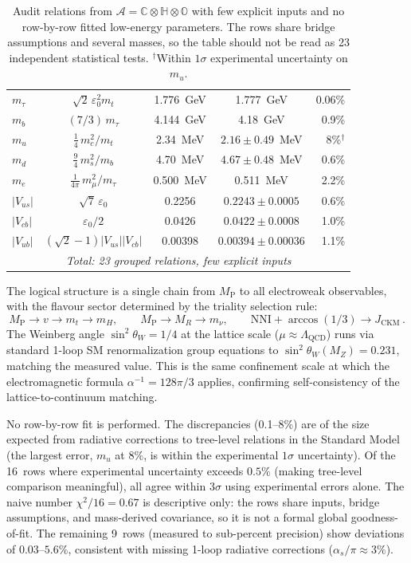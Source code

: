 \documentclass[12pt,a4paper]{article}
\theoremstyle{definition}
\theoremstyle{remark}
\newcommand{\Oct}{\mathbb{O}}
\newcommand{\Quat}{\mathbb{H}}
\newcommand{\Comp}{\mathbb{C}}
\newcommand{\Alg}{\mathcal{A}}
\newcommand{\MP}{M_{\mathrm{P}}}
\newcommand{\MR}{M_R}
\begin{document}
\begin{table}[h]
\begin{tabular}{@{}lcccr@{}}
$m_\tau$ & $\sqrt{2}\,\varepsilon_0^2 m_t$ & 1.776~GeV & 1.777~GeV & 0.06\% \\
$m_b$ & $(7/3)\,m_\tau$ & 4.144~GeV & 4.18~GeV & 0.9\% \\
$m_u$ & $\frac{1}{4}\,m_c^2/m_t$ & 2.34~MeV & $2.16\pm0.49$~MeV & 8\%$^\dagger$ \\
$m_d$ & $\frac{9}{4}\,m_s^2/m_b$ & 4.70~MeV & $4.67\pm0.48$~MeV & 0.6\% \\
$m_e$ & $\frac{1}{4\pi}\,m_\mu^2/m_\tau$ & 0.500~MeV & 0.511~MeV & 2.2\% \\
$|V_{us}|$ & $\sqrt{7}\,\varepsilon_0$ & 0.2256 & $0.2243\pm0.0005$ & 0.6\% \\
$|V_{cb}|$ & $\varepsilon_0/2$ & 0.0426 & $0.0422\pm0.0008$ & 1.0\% \\
$|V_{ub}|$ & $(\sqrt{2}{-}1)|V_{us}||V_{cb}|$ & 0.00398 & $0.00394\pm0.00036$ & 1.1\% \\
\midrule
\multicolumn{5}{c}{\textit{Total: 23 grouped relations, few explicit inputs}} \\
\bottomrule
\end{tabular}
\caption{Audit relations from $\Alg = \Comp\otimes\Quat\otimes\Oct$ with few 
explicit inputs and no row-by-row fitted low-energy parameters. The rows share 
bridge assumptions and several masses, so the table should not be read as 23 
independent statistical tests. $^\dagger$Within $1\sigma$ experimental 
uncertainty on $m_u$.}
\label{tab:predictions}
\end{table}

The logical structure is a single chain from $\MP$ to all electroweak 
observables, with the flavour sector determined by the triality selection rule:
\begin{equation}
\MP \to v \to m_t \to m_H, \qquad \MP \to \MR \to m_\nu, \qquad
\text{NNI} + \arccos(1/3) \to J_{\text{CKM}}\,.
\end{equation}
The Weinberg angle $\sin^2\theta_W = 1/4$ at the lattice scale 
($\mu \approx \Lambda_{\text{QCD}}$) runs via standard 1-loop SM 
renormalization group equations to $\sin^2\theta_W(M_Z) = 0.231$, matching 
the measured value. This is the same confinement scale at which the 
electromagnetic formula $\alpha^{-1} = 128\pi/3$ applies, confirming 
self-consistency of the lattice-to-continuum matching.

No row-by-row fit is performed. The discrepancies (0.1--8\%) are of the size 
expected from radiative corrections to tree-level relations in the Standard 
Model (the largest error, $m_u$ at 8\%, is within the experimental $1\sigma$ 
uncertainty). Of the 16~rows where experimental uncertainty exceeds $0.5\%$ 
(making tree-level comparison meaningful), all agree within $3\sigma$ using 
experimental errors alone. The naive number $\chi^2/16 = 0.67$ is descriptive 
only: the rows share inputs, bridge assumptions, and mass-derived covariance, 
so it is not a formal global goodness-of-fit. The remaining 9~rows (measured to 
sub-percent precision) show deviations of $0.03$--$5.6\%$, consistent with 
missing 1-loop radiative corrections ($\alpha_s/\pi \approx 3\%$).
\end{document}
